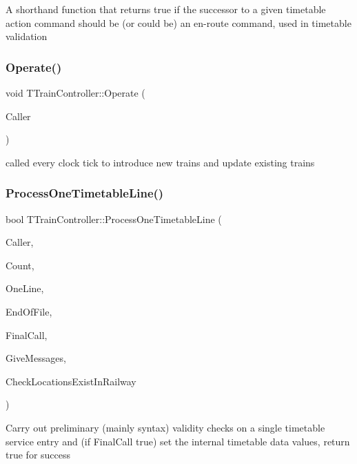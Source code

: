 A shorthand function that returns true if the successor to a given timetable action command should be (or could be) an en-\/route command, used in timetable validation \mbox{\label{class_t_train_controller_a20a1576dea1d86ed78fc5e9f46343481}} 
\subsubsection{\texorpdfstring{Operate()}{Operate()}}
{\footnotesize\ttfamily void T\+Train\+Controller\+::\+Operate (\begin{DoxyParamCaption}\item[{int}]{Caller }\end{DoxyParamCaption})}

called every clock tick to introduce new trains and update existing trains \mbox{\label{class_t_train_controller_a5c51eb1e0018e189966ffdbc5d251990}} 
\subsubsection{\texorpdfstring{Process\+One\+Timetable\+Line()}{ProcessOneTimetableLine()}}
{\footnotesize\ttfamily bool T\+Train\+Controller\+::\+Process\+One\+Timetable\+Line (\begin{DoxyParamCaption}\item[{int}]{Caller,  }\item[{int}]{Count,  }\item[{Ansi\+String}]{One\+Line,  }\item[{bool \&}]{End\+Of\+File,  }\item[{bool}]{Final\+Call,  }\item[{bool}]{Give\+Messages,  }\item[{bool}]{Check\+Locations\+Exist\+In\+Railway }\end{DoxyParamCaption})}

Carry out preliminary (mainly syntax) validity checks on a single timetable service entry and (if Final\+Call true) set the internal timetable data values, return true for success \mbox{\label{class_t_train_controller_a6161618bda2a677f797eda9a9deeb9fa}} 
